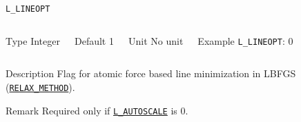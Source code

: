 \documentclass[xcolor=dvipsnames,t]{beamer}
\begin{document}
\begin{frame}[allowframebreaks]{\texttt{L\_LINEOPT}} \label{L_LINEOPT}
\vspace*{-12pt}
\begin{columns}
\begin{block}{Type}
Integer
\end{block}

\begin{block}{Default}
1
\end{block}

\begin{block}{Unit}
No unit
\end{block}

\begin{block}{Example}
\texttt{L\_LINEOPT}: 0
\end{block}
\end{columns}

\begin{block}{Description}
Flag for atomic force based line minimization in LBFGS (\hyperlink{RELAX_METHOD}{\texttt{RELAX\_METHOD}}). 
\end{block}

\begin{block}{Remark}
Required only if \hyperlink{L_AUTOSCALE}{\texttt{L\_AUTOSCALE}} is $0$.
\end{block}

\end{frame}
\end{document}
